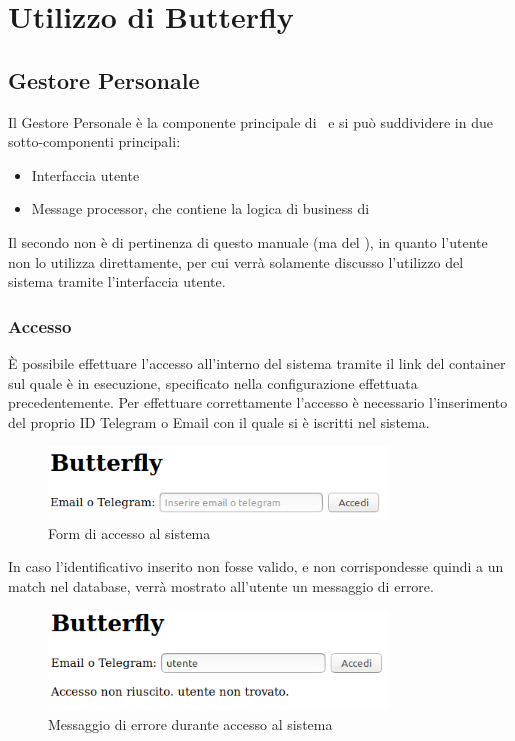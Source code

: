 \section{Utilizzo di Butterfly}\label{utilizzo}

\subsection{Gestore Personale}

Il Gestore Personale è la componente principale di \progetto\ e si può suddividere in due sotto-componenti principali:

\begin{itemize}
    \item Interfaccia utente
    \item Message processor, che contiene la logica di business di \progetto
\end{itemize}

Il secondo non è di pertinenza di questo manuale (ma del \MSd), in quanto l'utente non lo utilizza direttamente, per cui verrà solamente discusso l'utilizzo del sistema tramite l'interfaccia utente.

\subsubsection{Accesso}
È possibile effettuare l'accesso all'interno del sistema tramite il link del container sul quale è in esecuzione, specificato nella configurazione effettuata precedentemente.
Per effettuare correttamente l'accesso è necessario l'inserimento del proprio ID Telegram o Email con il quale si è iscritti nel sistema.
\begin{figure}[H]
	\centering
	\includegraphics[width=9cm]{img/accesso_1.png}
	\caption{Form di accesso al sistema}
\end{figure}
In caso l'identificativo inserito non fosse valido, e non corrispondesse quindi a un match nel database, verrà mostrato all'utente un messaggio di errore.
\begin{figure}[H]
	\centering
	\includegraphics[width=9cm]{img/accesso_2.png}
	\caption{Messaggio di errore durante accesso al sistema}
\end{figure}

